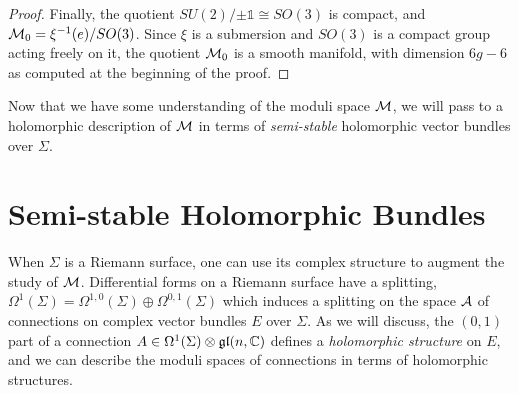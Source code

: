 \begin{proof}
		Finally, the quotient $SU(2)/{\pm \mathds{1}} \cong SO(3)$ is compact, and $\mathcal{M}_0 = \xi^{-1}(e)/SO(3)$. Since $\xi$ is a submersion and $SO(3)$ is a compact group acting freely on it, the quotient $\mathcal{M}_0$ is a smooth manifold, with dimension $6g-6$ as computed at the beginning of the proof.
	\end{proof}
	Now that we have some understanding of the moduli space $\mathcal{M}$, we will pass to a holomorphic description of $\mathcal{M}$ in terms of \emph{semi-stable} holomorphic vector bundles over $\Sigma$.
	\section{Semi-stable Holomorphic Bundles}
	\label{s:ss-bundles}
	When $\Sigma$ is a Riemann surface, one can use its complex structure to augment the study of $\mathcal{M}$. Differential forms on a Riemann surface have a splitting, $\Omega^1(\Sigma) = \Omega^{1,0}(\Sigma)\oplus \Omega^{0,1}(\Sigma)$ which induces a splitting on the space $\mathcal{A}$ of connections on complex vector bundles $E$ over $\Sigma$. As we will discuss, the $(0,1)$ part of a connection $A\in \Omega^1(\Sigma)\otimes \mathfrak{gl}(n,\mathbb{C})$ defines a \emph{holomorphic structure} on $E$, and we can describe the moduli spaces of connections in terms of holomorphic structures.
	

